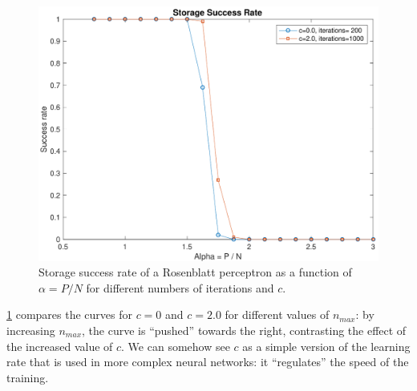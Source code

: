\begin{figure}[t]
	\centering
	\includegraphics[width=\columnwidth]{figures/bonus_2_c_epoch}
    \caption{Storage success rate of a Rosenblatt perceptron as a function of $\alpha = P / N$ for different numbers of iterations and $c$.}
	\label{fig:multiple_c_multiple_epoch}
\end{figure}
\cref{fig:multiple_c_multiple_epoch} compares the curves for $c = 0$ and $c = 2.0$ for different values of $n_{max}$:
by increasing $n_{max}$, the curve is ``pushed'' towards the right, contrasting the effect of the increased value of $c$.
We can somehow see $c$ as a simple version of the learning rate that is used in more complex neural networks: it ``regulates'' the speed of the training.

